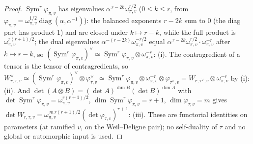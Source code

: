 \documentclass[11pt]{article}
\theoremstyle{definition}
\newcommand{\Sym}{\operatorname{Sym}}
\begin{document}
\begin{proof}
$\Sym^r\varphi_{\pi,v}$ has eigenvalues $\alpha^{\,r-2k}\omega_{\pi,v}^{r/2}$ ($0\le k\le r$, from
$\varphi_{\pi,v}=\omega_{\pi,v}^{1/2}\operatorname{diag}(\alpha,\alpha^{-1})$): the balanced exponents $r-2k$ sum
to $0$ (the diag part has product $1$) and are closed under $k\mapsto r-k$, while the full product is
$\omega_{\pi,v}^{r(r+1)/2}$; the dual eigenvalues $\alpha^{-(r-2k)}\omega_{\pi,v}^{-r/2}$ equal
$\alpha^{\,r-2k}\omega_{\pi,v}^{r/2}\cdot\omega_{\pi,v}^{-r}$ after $k\mapsto r-k$, so
$(\Sym^r\varphi_{\pi,v})^\vee\simeq\Sym^r\varphi_{\pi,v}\otimes\omega_{\pi,v}^{-r}$: \textup{(i)}. The
contragredient of a tensor is the tensor of contragredients, so $W_{r,\tau,v}^\vee\simeq
(\Sym^r\varphi_{\pi,v})^\vee\otimes\varphi_{\tau,v}^\vee\simeq\Sym^r\varphi_{\pi,v}\otimes\omega_{\pi,v}^{-r}
\otimes\varphi_{\tau^\vee,v}=W_{r,\tau^\vee,v}\otimes\omega_{\pi,v}^{-r}$ by \textup{(i)}: \textup{(ii)}. And
$\det(A\otimes B)=(\det A)^{\dim B}(\det B)^{\dim A}$ with $\det\Sym^r\varphi_{\pi,v}=\omega_{\pi,v}^{r(r+1)/2}$,
$\dim\Sym^r\varphi_{\pi,v}=r+1$, $\dim\varphi_{\tau,v}=m$ gives
$\det W_{r,\tau,v}=\omega_{\pi,v}^{\,m\,r(r+1)/2}(\det\varphi_{\tau,v})^{r+1}$: \textup{(iii)}. These
are functorial identities on parameters (at ramified $v$, on the Weil--Deligne pair); no self-duality of
$\tau$ and no global or automorphic input is used.
\end{proof}
\end{document}
